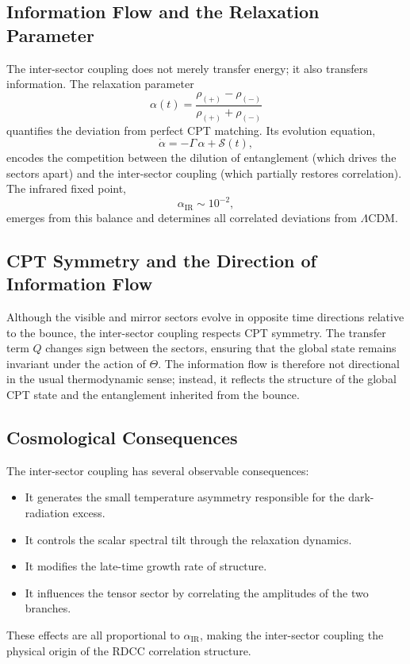 \documentclass[11pt,a4paper]{article}
\begin{document}
\subsection{Information Flow and the Relaxation Parameter}

The inter-sector coupling does not merely transfer energy; it also transfers information. The relaxation parameter
\begin{equation}
    \alpha(t) = \frac{\rho_{(+)} - \rho_{(-)}}{\rho_{(+)} + \rho_{(-)}}
\end{equation}
quantifies the deviation from perfect CPT matching. Its evolution equation,
\begin{equation}
    \dot{\alpha} = -\Gamma\,\alpha + \mathcal{S}(t),
\end{equation}
encodes the competition between the dilution of entanglement (which drives the sectors apart) and the inter-sector coupling (which partially restores correlation). The infrared fixed point,
\begin{equation}
    \alpha_{\mathrm{IR}} \sim 10^{-2},
\end{equation}
emerges from this balance and determines all correlated deviations from $\Lambda$CDM.

\subsection{CPT Symmetry and the Direction of Information Flow}

Although the visible and mirror sectors evolve in opposite time directions relative to the bounce, the inter-sector coupling respects CPT symmetry. The transfer term $Q$ changes sign between the sectors, ensuring that the global state remains invariant under the action of $\Theta$. The information flow is therefore not directional in the usual thermodynamic sense; instead, it reflects the structure of the global CPT state and the entanglement inherited from the bounce.

\subsection{Cosmological Consequences}

The inter-sector coupling has several observable consequences:
\begin{itemize}
    \item It generates the small temperature asymmetry responsible for the dark-radiation excess.
    \item It controls the scalar spectral tilt through the relaxation dynamics.
    \item It modifies the late-time growth rate of structure.
    \item It influences the tensor sector by correlating the amplitudes of the two branches.
\end{itemize}
These effects are all proportional to $\alpha_{\mathrm{IR}}$, making the inter-sector coupling the physical origin of the RDCC correlation structure.
\end{document}
